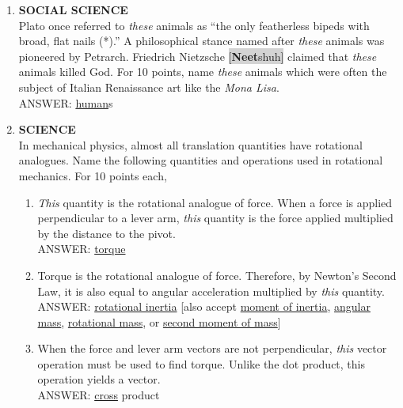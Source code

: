 \documentclass{report}
\newcommand*{\backtrack}{\setcounter{enumi}{\numexpr\theenumi-1\relax}}
\begin{document}
\begin{enumerate}
    \item \textbf{SOCIAL SCIENCE} \\ Plato once referred to \textit{these} animals as ``the only featherless bipeds with broad, flat nails (*).'' A philosophical stance named after \textit{these} animals was pioneered by Petrarch. Friedrich Nietzsche \colorbox{lightGray}{[\textbf{Neet}\textperiodcentered shuh]} claimed that \textit{these} animals killed God. For 10 points, name \textit{these} animals which were often the subject of Italian Renaissance art like the \textit{Mona Lisa}. \\ ANSWER: \underline{human}s \backtrack
    \item \textbf{SCIENCE} \\ In mechanical physics, almost all translation quantities have rotational analogues. Name the following quantities and operations used in rotational mechanics. For 10 points each,
    \begin{enumerate}[label=\Alph*]
        \item \textit{This} quantity is the rotational analogue of force. When a force is applied perpendicular to a lever arm, \textit{this} quantity is the force applied multiplied by the distance to the pivot. \\ ANSWER: \underline{torque}
        \item Torque is the rotational analogue of force. Therefore, by Newton's Second Law, it is also equal to angular acceleration multiplied by \textit{this} quantity. \\ ANSWER: \underline{rotational inertia} [also accept \underline{moment of inertia}, \underline{angular mass}, \underline{rotational mass}, or \underline{second moment of mass}]
        \item When the force and lever arm vectors are not perpendicular, \textit{this} vector operation must be used to find torque. Unlike the dot product, this operation yields a vector. \\ ANSWER: \underline{cross} product
    \end{enumerate} 


\end{enumerate}
\end{document}
